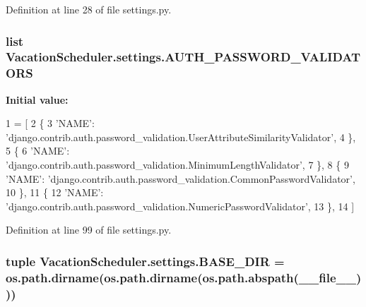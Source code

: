 Definition at line 28 of file settings.\-py.

\hypertarget{namespaceVacationScheduler_1_1settings_a8951ccc7a8fd315625233bdc964d1735}{
\subsubsection[{A\-U\-T\-H\-\_\-\-P\-A\-S\-S\-W\-O\-R\-D\-\_\-\-V\-A\-L\-I\-D\-A\-T\-O\-R\-S}]{\setlength{\rightskip}{0pt plus 5cm}list Vacation\-Scheduler.\-settings.\-A\-U\-T\-H\-\_\-\-P\-A\-S\-S\-W\-O\-R\-D\-\_\-\-V\-A\-L\-I\-D\-A\-T\-O\-R\-S}}\label{namespaceVacationScheduler_1_1settings_a8951ccc7a8fd315625233bdc964d1735}
{\bfseries Initial value\-:}
\begin{DoxyCode}
1 = [
2     \{
3         \textcolor{stringliteral}{'NAME'}: \textcolor{stringliteral}{'django.contrib.auth.password\_validation.UserAttributeSimilarityValidator'},
4     \},
5     \{
6         \textcolor{stringliteral}{'NAME'}: \textcolor{stringliteral}{'django.contrib.auth.password\_validation.MinimumLengthValidator'},
7     \},
8     \{
9         \textcolor{stringliteral}{'NAME'}: \textcolor{stringliteral}{'django.contrib.auth.password\_validation.CommonPasswordValidator'},
10     \},
11     \{
12         \textcolor{stringliteral}{'NAME'}: \textcolor{stringliteral}{'django.contrib.auth.password\_validation.NumericPasswordValidator'},
13     \},
14 ]
\end{DoxyCode}


Definition at line 99 of file settings.\-py.

\hypertarget{namespaceVacationScheduler_1_1settings_aecdfd4355a884d98dd8879e279d3fa57}{
\subsubsection[{B\-A\-S\-E\-\_\-\-D\-I\-R}]{\setlength{\rightskip}{0pt plus 5cm}tuple Vacation\-Scheduler.\-settings.\-B\-A\-S\-E\-\_\-\-D\-I\-R = os.\-path.\-dirname(os.\-path.\-dirname(os.\-path.\-abspath(\-\_\-\-\_\-file\-\_\-\-\_\-)))}}\label{namespaceVacationScheduler_1_1settings_aecdfd4355a884d98dd8879e279d3fa57}


